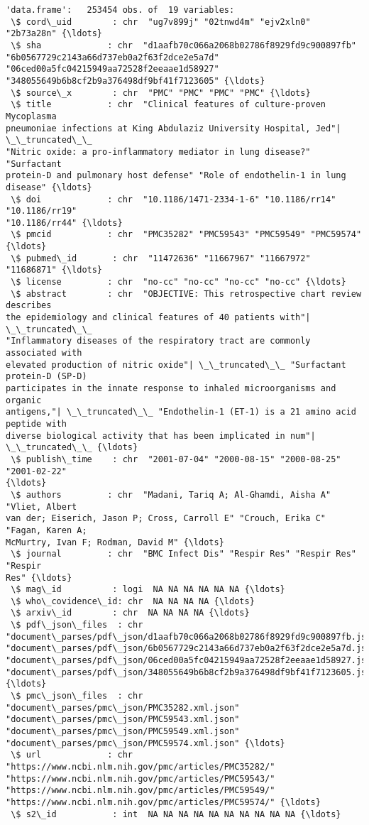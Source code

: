 \documentclass[11pt]{article}
\begin{document}
    \begin{Verbatim}[commandchars=\\\{\}]
'data.frame':   253454 obs. of  19 variables:
 \$ cord\_uid        : chr  "ug7v899j" "02tnwd4m" "ejv2xln0" "2b73a28n" {\ldots}
 \$ sha             : chr  "d1aafb70c066a2068b02786f8929fd9c900897fb"
"6b0567729c2143a66d737eb0a2f63f2dce2e5a7d"
"06ced00a5fc04215949aa72528f2eeaae1d58927"
"348055649b6b8cf2b9a376498df9bf41f7123605" {\ldots}
 \$ source\_x        : chr  "PMC" "PMC" "PMC" "PMC" {\ldots}
 \$ title           : chr  "Clinical features of culture-proven Mycoplasma
pneumoniae infections at King Abdulaziz University Hospital, Jed"| \_\_truncated\_\_
"Nitric oxide: a pro-inflammatory mediator in lung disease?" "Surfactant
protein-D and pulmonary host defense" "Role of endothelin-1 in lung disease" {\ldots}
 \$ doi             : chr  "10.1186/1471-2334-1-6" "10.1186/rr14" "10.1186/rr19"
"10.1186/rr44" {\ldots}
 \$ pmcid           : chr  "PMC35282" "PMC59543" "PMC59549" "PMC59574" {\ldots}
 \$ pubmed\_id       : chr  "11472636" "11667967" "11667972" "11686871" {\ldots}
 \$ license         : chr  "no-cc" "no-cc" "no-cc" "no-cc" {\ldots}
 \$ abstract        : chr  "OBJECTIVE: This retrospective chart review describes
the epidemiology and clinical features of 40 patients with"| \_\_truncated\_\_
"Inflammatory diseases of the respiratory tract are commonly associated with
elevated production of nitric oxide"| \_\_truncated\_\_ "Surfactant protein-D (SP-D)
participates in the innate response to inhaled microorganisms and organic
antigens,"| \_\_truncated\_\_ "Endothelin-1 (ET-1) is a 21 amino acid peptide with
diverse biological activity that has been implicated in num"| \_\_truncated\_\_ {\ldots}
 \$ publish\_time    : chr  "2001-07-04" "2000-08-15" "2000-08-25" "2001-02-22"
{\ldots}
 \$ authors         : chr  "Madani, Tariq A; Al-Ghamdi, Aisha A" "Vliet, Albert
van der; Eiserich, Jason P; Cross, Carroll E" "Crouch, Erika C" "Fagan, Karen A;
McMurtry, Ivan F; Rodman, David M" {\ldots}
 \$ journal         : chr  "BMC Infect Dis" "Respir Res" "Respir Res" "Respir
Res" {\ldots}
 \$ mag\_id          : logi  NA NA NA NA NA NA {\ldots}
 \$ who\_covidence\_id: chr  NA NA NA NA {\ldots}
 \$ arxiv\_id        : chr  NA NA NA NA {\ldots}
 \$ pdf\_json\_files  : chr
"document\_parses/pdf\_json/d1aafb70c066a2068b02786f8929fd9c900897fb.json"
"document\_parses/pdf\_json/6b0567729c2143a66d737eb0a2f63f2dce2e5a7d.json"
"document\_parses/pdf\_json/06ced00a5fc04215949aa72528f2eeaae1d58927.json"
"document\_parses/pdf\_json/348055649b6b8cf2b9a376498df9bf41f7123605.json" {\ldots}
 \$ pmc\_json\_files  : chr  "document\_parses/pmc\_json/PMC35282.xml.json"
"document\_parses/pmc\_json/PMC59543.xml.json"
"document\_parses/pmc\_json/PMC59549.xml.json"
"document\_parses/pmc\_json/PMC59574.xml.json" {\ldots}
 \$ url             : chr  "https://www.ncbi.nlm.nih.gov/pmc/articles/PMC35282/"
"https://www.ncbi.nlm.nih.gov/pmc/articles/PMC59543/"
"https://www.ncbi.nlm.nih.gov/pmc/articles/PMC59549/"
"https://www.ncbi.nlm.nih.gov/pmc/articles/PMC59574/" {\ldots}
 \$ s2\_id           : int  NA NA NA NA NA NA NA NA NA NA {\ldots}
    \end{Verbatim}
\end{document}
